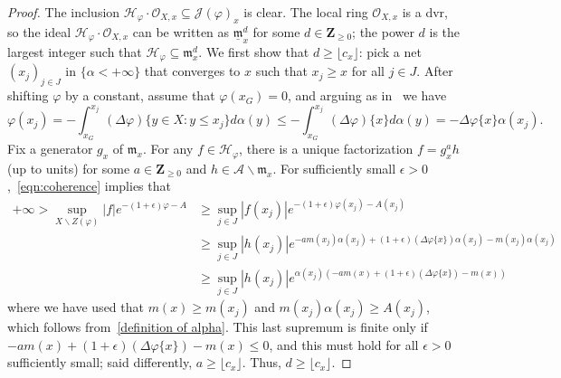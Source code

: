 \documentclass[10pt,reqno]{amsart}
\theoremstyle{plain}
\theoremstyle{definition}
\newcommand{\Z}{\mathbf{Z}}
\newcommand{\frakm}{\mathfrak{m}}
\renewcommand{\H}{\mathcal{H}}
\numberwithin{equation}{section}
\renewcommand{\O}{\mathcal{O}}
\newcommand{\J}{\mathcal{J}}
\begin{document}
\begin{proof}
The inclusion $\H_{\varphi} \cdot \O_{X,x} \subseteq \J(\varphi)_x$ is clear. 
The local ring $\O_{X,x}$ is a dvr, so the ideal $\H_{\varphi} \cdot \O_{X,x}$ can be written as $\underline{\frakm}_x^d$ for some $d \in \Z_{\geq 0}$; the power $d$ is the largest integer such that $\H_{\varphi} \subseteq \frakm_x^d$. 
We first show that $d \geq \lfloor c_x \rfloor$:
pick a net $(x_{j})_{j \in J}$ in $\{ \alpha < +\infty \}$ that converges to $x$ such that $x_j \geq x$ for all $j \in J$. 
After shifting $\varphi$ by a constant, assume that $\varphi(x_G) = 0$, and arguing as in~\cite[Lemma 2.9]{dynberko} we have
\begin{equation}\label{eqn:coherence}
\varphi(x_j) = -\int_{x_G}^{x_j} (\Delta \varphi)\{ y \in X \colon y \leq x_j \} d\alpha(y) \leq -\int_{x_G}^{x_j} (\Delta \varphi)\{ x \} d\alpha(y) = -\Delta \varphi\{ x \} \alpha(x_j).
\end{equation}
Fix a generator $g_x$ of $\frakm_x$. 
For any $f \in \H_{\varphi}$, there is a unique factorization $f = g_x^a h$ (up to units) for some $a \in \Z_{\geq 0}$ and $h \in \mathcal{A} \backslash \frakm_x$. 
For sufficiently small $\epsilon > 0$,~\cref{eqn:coherence} implies that
\begin{align*}
+\infty > \sup_{X \backslash Z(\varphi)} |f|e^{-(1+\epsilon)\varphi-A} 
&\geq \sup_{j \in J} |f(x_j)| e^{-(1+\epsilon)\varphi(x_j) - A(x_j)} \\
&\geq \sup_{j \in J} |h(x_j)| e^{-am(x_j)\alpha(x_j) + (1+\epsilon) (\Delta \varphi \{ x \})\alpha(x_j) - m(x_j)\alpha(x_j)}\\
&\geq \sup_{j \in J} |h(x_j)| e^{\alpha(x_j)\left(-am(x) + (1+\epsilon) (\Delta \varphi \{ x \})- m(x) \right)}
\end{align*}
where we have used that $m(x) \geq m(x_j)$ and $m(x_j)\alpha(x_j) \geq A(x_j)$, which follows from~\cref{definition of alpha}.
This last supremum is finite only if $-am(x) + (1+\epsilon) (\Delta \varphi \{ x \})- m(x) \leq 0$, and this must hold for all $\epsilon > 0$ sufficiently small; said differently, $a \geq \lfloor c_x \rfloor$. 
Thus, $d \geq \lfloor c_x \rfloor$. 


\end{proof}
\end{document}
